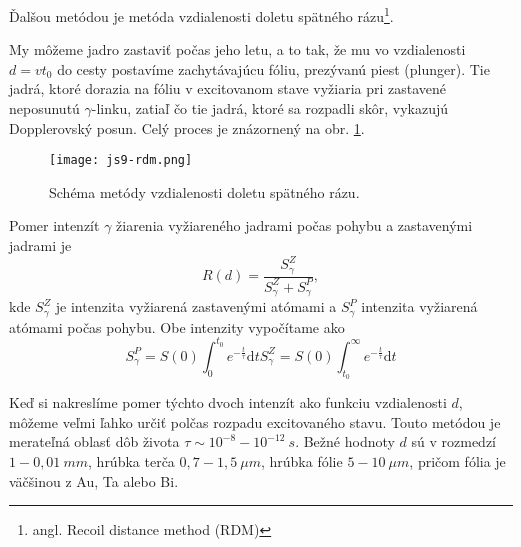 \documentclass[../../main.tex]{subfiles}
\begin{document}
Ďalšou metódou je metóda vzdialenosti doletu spätného rázu\footnote{angl. Recoil distance method (RDM)}.

My môžeme jadro zastaviť počas jeho letu, a to tak, že mu vo vzdialenosti $d=vt_0$ do cesty postavíme zachytávajúcu fóliu, prezývanú piest (plunger). Tie jadrá, ktoré dorazia na fóliu v excitovanom stave vyžiaria pri zastavené neposunutú $\gamma$-linku, zatiaľ čo tie jadrá, ktoré sa rozpadli skôr, vykazujú Dopplerovský posun. Celý proces je znázornený na obr. \ref{js9:img:rdm}.

\begin{figure}[h!]
\centering
\texttt{[image: js9-rdm.png]}
\caption{Schéma metódy vzdialenosti doletu spätného rázu.}
\label{js9:img:rdm}
\end{figure}


Pomer intenzít $\gamma$ žiarenia vyžiareného jadrami počas pohybu a zastavenými jadrami je 
\begin{equation}
R(d)=\dfrac{S_\gamma^Z}{S_\gamma^Z+S_\gamma^P},
\end{equation} 
kde $S_\gamma^Z$ je intenzita vyžiarená zastavenými atómami a $S_\gamma^P$ intenzita vyžiarená atómami počas pohybu. Obe intenzity vypočítame ako
\begin{subequations}
\begin{equation}
S_\gamma^P=S(0)\int_0^{t_0}e^{-\frac{t}{\tau}}\mathrm{d}t
\end{equation}
\begin{equation}
S_\gamma^Z=S(0)\int_{t_0}^\infty e^{-\frac{t}{\tau}}\mathrm{d}t
\end{equation}
\end{subequations}

Keď si nakreslíme pomer týchto dvoch intenzít ako funkciu vzdialenosti $d$, môžeme veľmi ľahko určiť polčas rozpadu excitovaného stavu. Touto metódou je merateľná oblasť dôb života $\tau\sim 10^{-8}-10^{-12}\:\unit{s}$. Bežné hodnoty $d$ sú v rozmedzí $1-0,01\:\unit{mm}$, hrúbka terča $0,7-1,5\:\unit{\mu m}$, hrúbka fólie $5-10\:\unit{\mu m}$, pričom fólia je väčšinou z Au, Ta alebo Bi. 
\end{document}
